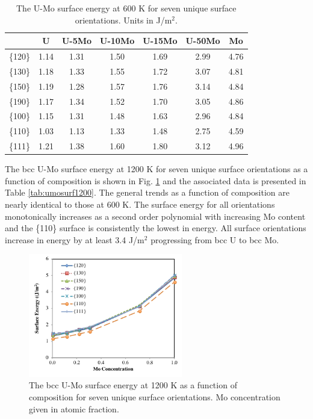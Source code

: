 \documentclass[review]{elsarticle}
\providecommand{\DIFaddbeginFL}{} %
\providecommand{\DIFaddendFL}{} %
\providecommand{\DIFdelbeginFL}{} %
\providecommand{\DIFdelendFL}{} %
\newcommand{\DIFscaledelfig}{0.5}
\newlength{\DIFdelgraphicswidth} %
\newlength{\DIFdelgraphicsheight} %
\newcommand{\DIFaddincludegraphics}[2][]{{\color{blue}\fbox{\DIFOincludegraphics[#1]{#2}}}} %
\newcommand{\DIFdelincludegraphics}[2][]{%
\sbox{\DIFdelgraphicsbox}{\DIFOincludegraphics[#1]{#2}}%
\settoboxwidth{\DIFdelgraphicswidth}{\DIFdelgraphicsbox} %
\settoboxtotalheight{\DIFdelgraphicsheight}{\DIFdelgraphicsbox} %
\scalebox{\DIFscaledelfig}{%
\parbox[b]{\DIFdelgraphicswidth}{\usebox{\DIFdelgraphicsbox}\\[-\baselineskip] \rule{\DIFdelgraphicswidth}{0em}}\llap{\resizebox{\DIFdelgraphicswidth}{\DIFdelgraphicsheight}{%
\setlength{\unitlength}{\DIFdelgraphicswidth}%
\begin{picture}(1,1)%
\thicklines\linethickness{2pt} %
{\color[rgb]{1,0,0}\put(0,0){\framebox(1,1){}}}%
{\color[rgb]{1,0,0}\put(0,0){\line( 1,1){1}}}%
{\color[rgb]{1,0,0}\put(0,1){\line(1,-1){1}}}%
\end{picture}%
}\hspace*{3pt}}} %
} %
\DeclareRobustCommand{\DIFaddbeginFL}{\DIFOaddbeginFL \let\includegraphics\DIFaddincludegraphics} %
\DeclareRobustCommand{\DIFaddendFL}{\DIFOaddendFL \let\includegraphics\DIFOincludegraphics} %
\DeclareRobustCommand{\DIFdelbeginFL}{\DIFOdelbeginFL \let\includegraphics\DIFdelincludegraphics} %
\DeclareRobustCommand{\DIFdelendFL}{\DIFOaddendFL \let\includegraphics\DIFOincludegraphics} %
\begin{document}
\begin{table}[h]
\caption{The U-Mo surface energy at 600 K for seven unique surface orientations. Units in J/m$^{2}$. } \label{tab:umosurf600}
\begin{center}
\begin{tabular}{|c|c|c|c|c|c|c|}
	\hline
 & U & U-5Mo & U-10Mo & U-15Mo & U-50Mo & Mo \\
\hline
\{120\} & 1.14 & 1.31 & 1.50 & 1.69 & 2.99 & 4.76 \\
\{130\}	 & 1.18 & 1.33 & 1.55 & 1.72 & 3.07 & 4.81 \\ 
\{150\}	 & 1.19 & 1.28 & 1.57 & 1.76 & 3.14 & 4.84 \\
\{190\}	 & 1.17 & 1.34 & 1.52 & 1.70 & 3.05 & 4.86 \\
\{100\}	 & 1.15 & 1.31 & 1.48 & 1.63 & 2.96 & 4.84 \\
\{110\}	 & 1.03 & 1.13 & 1.33 & 1.48 & 2.75 & 4.59 \\
\{111\}	 & 1.21 & 1.38 & 1.60 & 1.80 & 3.12 & 4.96 \\
 	 \hline
\end{tabular}
\end{center}
\label{default}
\end{table}

\FloatBarrier

The bcc U-Mo surface energy at 1200 K for seven unique surface orientations as a function of composition is shown in Fig. \ref{fig:umosurf1200} and the associated data is presented in Table \ref{tab:umosurf1200}. The general trends as a function of composition are nearly identical to those at 600 K. The surface energy for all orientations monotonically increases as a second order polynomial with increasing Mo content and the \{110\} surface is consistently the lowest in energy. All surface orientations increase in energy by at least 3.4 J/m$^{2}$ progressing from bcc U to bcc Mo. 

\begin{figure}[h]
 \centering
 \DIFdelbeginFL %
\DIFdelendFL \DIFaddbeginFL \includegraphics[width=0.6\textwidth]{umosurf1200A.png} 
 \DIFaddendFL \caption{The bcc U-Mo surface energy at 1200 K as a function of composition for seven unique surface orientations. Mo concentration given in atomic fraction.}
 \label{fig:umosurf1200}
\end{figure}
\end{document}
